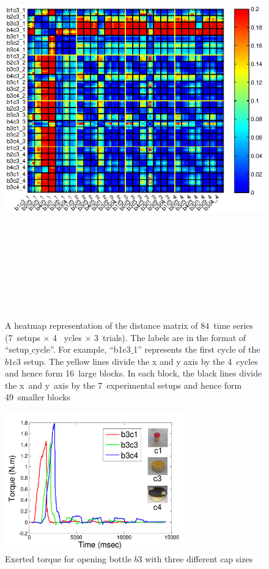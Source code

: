 \begin{figure}
\label{heatmap}
  \centering
  \includegraphics[width=18cm,height=18cm]{./fig/heatmap_all6_3.eps}
  \caption{ \scriptsize{A heatmap representation of the distance
      matrix of 84~time series (7~setups $\times$ 4 ~ycles $\times$
      3~trials). The labels are in the format of
      ``setup$\_$cycle''. For example, ``b1c3$\_$1'' represents the
      first cycle of the $b1c3$ setup. The yellow lines divide the x
      and y axis by the 4~cycles and hence form 16~large blocks. In
      each block, the black lines divide the x~and y~axis by the
      7~experimental setups and hence form 49~smaller blocks }  }
\label{fig:heatmap}
\end{figure}

\begin{figure}
    \centering
    \includegraphics[width=8cm]{./fig/c1c3c4_time_T.pdf}
    \caption{ \scriptsize{Exerted torque for opening bottle $b3$ with three different cap sizes}
}
\label{fig:cappatterns}
\end{figure}


